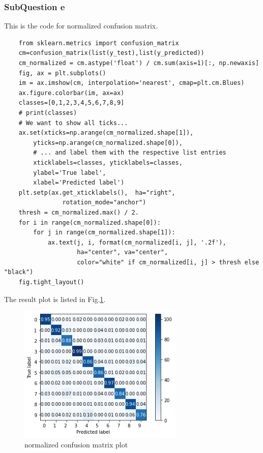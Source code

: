 \documentclass[conference]{IEEEtran}
\begin{document}
\subsubsection{SubQuestion e}
This is the code for normalized confusion matrix.
\begin{lstlisting}
    from sklearn.metrics import confusion_matrix
    cm=confusion_matrix(list(y_test),list(y_predicted))
    cm_normalized = cm.astype('float') / cm.sum(axis=1)[:, np.newaxis]
    fig, ax = plt.subplots()
    im = ax.imshow(cm, interpolation='nearest', cmap=plt.cm.Blues)
    ax.figure.colorbar(im, ax=ax)
    classes=[0,1,2,3,4,5,6,7,8,9]
    # print(classes)
    # We want to show all ticks...
    ax.set(xticks=np.arange(cm_normalized.shape[1]),
        yticks=np.arange(cm_normalized.shape[0]),
        # ... and label them with the respective list entries
        xticklabels=classes, yticklabels=classes,
        ylabel='True label',
        xlabel='Predicted label')
    plt.setp(ax.get_xticklabels(),  ha="right",
                rotation_mode="anchor")
    thresh = cm_normalized.max() / 2.
    for i in range(cm_normalized.shape[0]):
        for j in range(cm_normalized.shape[1]):
            ax.text(j, i, format(cm_normalized[i, j], '.2f'),
                    ha="center", va="center",
                    color="white" if cm_normalized[i, j] > thresh else "black")
    fig.tight_layout()
\end{lstlisting}
The result plot is listed in Fig.\ref{Fig.t1q3e}.
\begin{figure}[H] 
    \centering %
    \includegraphics[width=0.7\textwidth]{T1Q3e.png} %
    \caption{normalized confusion matrix plot} %
    \label{Fig.t1q3e} %
\end{figure}
\end{document}

